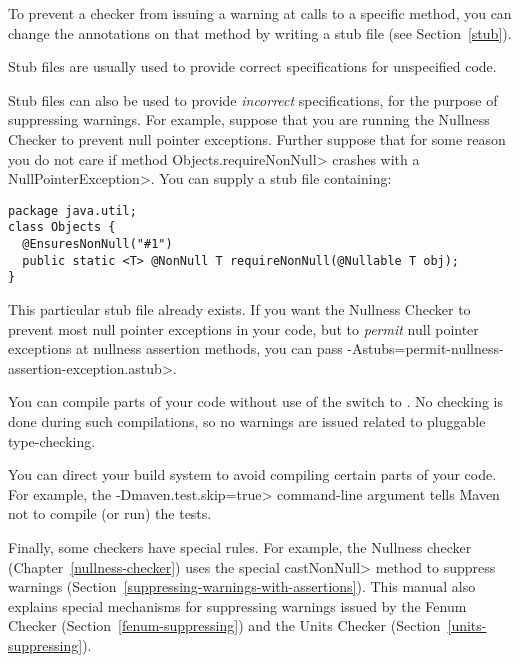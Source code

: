 
To prevent a checker from issuing a warning at calls to a specific method,
you can change the annotations on that method by writing a stub file (see
Section~\ref{stub}).

Stub files are usually used to provide correct specifications for
unspecified code.

Stub files can also be used to provide \emph{incorrect} specifications, for
the purpose of suppressing warnings.  For example, suppose that you are
running the Nullness Checker to prevent null pointer exceptions.  Further
suppose that for some reason you do not care if method
\<Objects.requireNonNull> crashes with a \<NullPointerException>.  You can
supply a stub file containing:

\begin{Verbatim}
package java.util;
class Objects {
  @EnsuresNonNull("#1")
  public static <T> @NonNull T requireNonNull(@Nullable T obj);
}
\end{Verbatim}

This particular stub file already exists.
If you want the Nullness Checker to prevent most null
pointer exceptions in your code, but to \emph{permit} null pointer
exceptions at nullness assertion methods, you can pass
\<-Astubs=permit-nullness-assertion-exception.astub>.



You can compile parts of your code without use of the
 switch to .  No checking is done during
such compilations, so no warnings are issued related to pluggable
type-checking.

You can direct your build system to avoid compiling certain parts of your
code.  For example, the \<-Dmaven.test.skip=true> command-line argument
tells Maven not to compile (or run) the tests.



Finally, some checkers have special rules.  For example, the Nullness
checker (Chapter~\ref{nullness-checker}) uses
the special \<castNonNull> method to suppress warnings
(Section~\ref{suppressing-warnings-with-assertions}).
This manual also explains special mechanisms for
suppressing warnings issued by the Fenum Checker
(Section~\ref{fenum-suppressing}) and the Units Checker
(Section~\ref{units-suppressing}).


